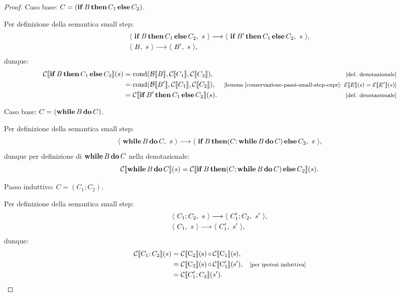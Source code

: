 \begin{proposizione}
\begin{proof}
Caso base: $C = (\mathop{\textup{\textbf{if}}} B \mathop{\textup{\textbf{then}}} C_1 \mathop{\textup{\textbf{else}}} C_2)$.

Per definizione della semantica small step:
\begin{align*}
  &\langle\ \mathop{\textup{\textbf{if}}} B \mathop{\textup{\textbf{then}}} C_1 \mathop{\textup{\textbf{else}}} C_2,\ s\ \rangle \longrightarrow
  \langle\ \mathop{\textup{\textbf{if}}} B' \mathop{\textup{\textbf{then}}} C_1 \mathop{\textup{\textbf{else}}} C_2,\ s\ \rangle, \\
  &\langle\ B,\ s\ \rangle \longrightarrow \langle\ B',\ s\ \rangle,
\end{align*}
dunque:
\begin{align*}
  \calC\llbracket \kw{if} B \kw{then} C_1 \kw{else} C_2 \rrbracket(s)
  &= \cond(\calB\llbracket B \rrbracket,
    \calC\llbracket C_1 \rrbracket,
    \calC\llbracket C_2 \rrbracket),
    &\law{def. denotazionale} \\
  &= \cond(\calB\llbracket B' \rrbracket,
    \calC\llbracket C_1 \rrbracket,
    \calC\llbracket C_2 \rrbracket),
    &\law{lemma
      \ref{conservazione-passi-small-step-expr}:
      $\calE\llbracket E \rrbracket(s)
      = \calE\llbracket E' \rrbracket(s)$} \\
  &= \calC\llbracket \kw{if} B' \kw{then} C_1 \kw{else} C_2 \rrbracket(s).
     &\law{def. denotazionale}
\end{align*}

Caso base:  $C = (\mathop{\textup{\textbf{while}}} B \mathop{\textup{\textbf{do}}} C)$.

Per definizione della semantica small step:
\[
  \langle\ \mathop{\textup{\textbf{while}}} B \mathop{\textup{\textbf{do}}} C,\ s\ \rangle \longrightarrow
    \langle\ \mathop{\textup{\textbf{if}}} B \mathop{\textup{\textbf{then}}} (C ; \mathop{\textup{\textbf{while}}} B \mathop{\textup{\textbf{do}}} C) \mathop{\textup{\textbf{else}}} C_2,\ s\ \rangle,
\]
dunque per definizione di $\mathop{\textup{\textbf{while}}} B \mathop{\textup{\textbf{do}}} C$ nella denotazionale:
\[
  \mathcal{C}\llbracket \mathop{\textup{\textbf{while}}} B \mathop{\textup{\textbf{do}}} C \rrbracket(s)
    =  \mathcal{C}\llbracket \mathop{\textup{\textbf{if}}} B \mathop{\textup{\textbf{then}}} (C ; \mathop{\textup{\textbf{while}}} B \mathop{\textup{\textbf{do}}} C)
    \mathop{\textup{\textbf{else}}} C_2 \rrbracket(s).
\]


Passo induttivo: $C = (C_1; C_2)$.

Per definizione della semantica small step:
\begin{align*}
  &\langle\ C_1; C_2,\ s\ \rangle \longrightarrow \langle\ C_1'; C_2,\ s'\ \rangle, \\
  &\langle\ C_1,\ s\ \rangle \longrightarrow \langle\ C_1',\ s'\ \rangle,
\end{align*}
dunque:
\begin{align*}
  \calC\llbracket C_1; C_2 \rrbracket(s)
  &= \compfun{\calC\llbracket C_2 \rrbracket(s)}{\calC\llbracket C_1
    \rrbracket(s)}, \\
  &= \compfun{\calC\llbracket C_2 \rrbracket(s)}{\calC\llbracket C_1'
    \rrbracket(s')},
    &\law{per ipotesi induttiva} \\
  &= \calC\llbracket C_1'; C_2 \rrbracket(s').
\end{align*}
\end{proof}
\end{proposizione}

